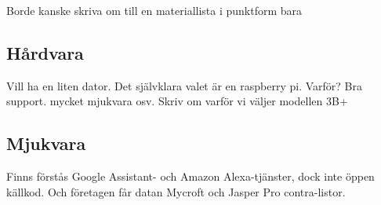 Borde kanske skriva om till en materiallista i punktform bara
\subsection{Hårdvara}
Vill ha en liten dator. Det självklara valet är en raspberry pi. Varför? Bra support. mycket mjukvara osv.
Skriv om varför vi väljer modellen 3B+ \cite{geerling}

\subsection{Mjukvara}
Finns förstås Google Assistant- och Amazon Alexa-tjänster, dock inte öppen källkod. Och företagen får datan
Mycroft och Jasper
Pro contra-listor.